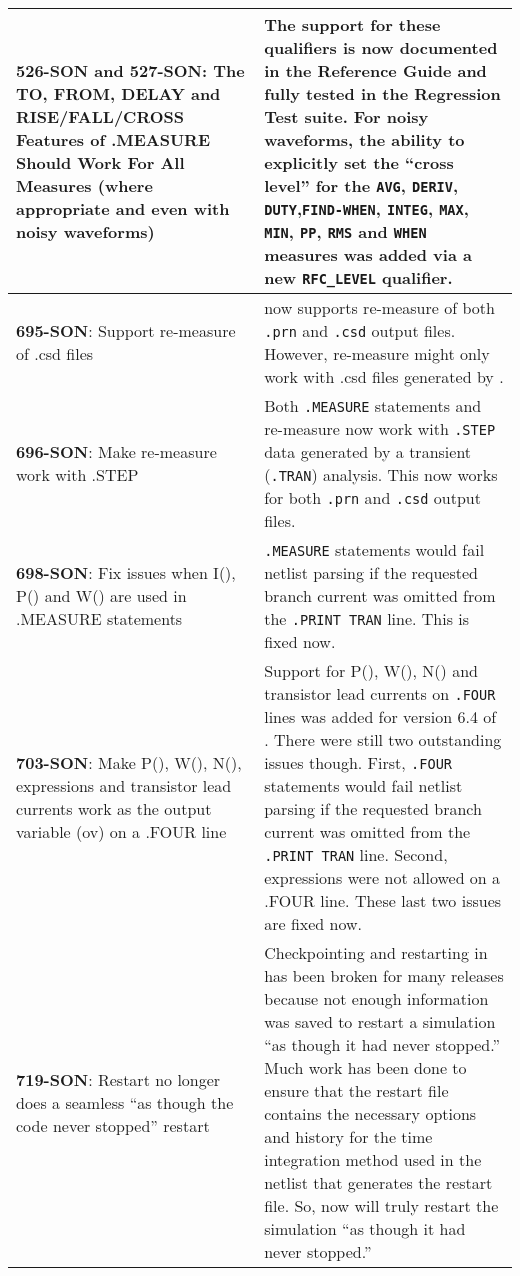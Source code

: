 {\begin{longtable}[h] {>{\raggedright\small}m{2in}|>{\raggedright\let\\\tabularnewline\small}m{3.5in}}
     \textbf{526-SON and 527-SON}: The TO, FROM, DELAY and RISE/FALL/CROSS Features of 
     .MEASURE Should Work For All Measures (where appropriate and even with noisy waveforms) & 
     The support for these qualifiers is now documented in the Reference Guide and fully tested
     in the Regression Test suite.  For noisy waveforms, the ability to explicitly set the
     ``cross level'' for the \texttt{AVG}, \texttt{DERIV}, \texttt{DUTY},\texttt{FIND-WHEN},
     \texttt{INTEG}, \texttt{MAX}, \texttt{MIN}, \texttt{PP}, \texttt{RMS} and \texttt{WHEN}
     measures was added via a new \texttt{RFC\_LEVEL} qualifier. \\ \hline   

     \textbf{695-SON}:  Support re-measure of .csd files & \Xyce{} now supports re-measure
     of both \texttt{.prn} and \texttt{.csd} output files.  However, re-measure might only
     work with .csd files generated by \Xyce{}.
     \\ \hline

     \textbf{696-SON}: Make re-measure work with .STEP & Both \texttt{.MEASURE} statements
     and re-measure now work with \texttt{.STEP} data generated by a transient (\texttt{.TRAN})
     analysis.  This now works for both \texttt{.prn} and \texttt{.csd} output files. 
     \\ \hline

     \textbf{698-SON}: Fix issues when I(), P() and W() are used in .MEASURE statements  &
     \texttt{.MEASURE} statements would fail netlist parsing if the requested branch current
     was omitted from the \texttt{.PRINT TRAN} line.  This is fixed now.
     \\ \hline

     \textbf{703-SON}: Make P(), W(), N(), expressions and transistor lead currents work 
     as the output variable (ov) on a .FOUR line & Support for P(), W(), N() and transistor
     lead currents on \texttt{.FOUR} lines was added for version 6.4 of \Xyce{}. There were still
     two outstanding issues though.  First, \texttt{.FOUR} statements would fail netlist
     parsing if the requested branch current was omitted from the \texttt{.PRINT TRAN} line. 
     Second, expressions were not allowed on a .FOUR line.  These last two issues are fixed now.
     \\ \hline 

     \textbf{719-SON}: Restart no longer does a seamless ``as though the code never stopped'' restart &
     Checkpointing and restarting in \Xyce{} has been broken for many releases because 
     not enough information was saved to restart a simulation ``as though it had never stopped.''
     Much work has been done to ensure that the restart file contains the necessary options 
     and history for the time integration method used in the netlist that generates the restart file.
     So, now \Xyce{} will truly restart the simulation ``as though it had never stopped.''
     \\ \hline 


\end{longtable}}
